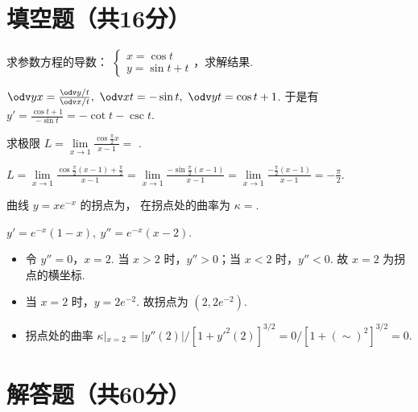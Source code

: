 \section{填空题（共16分）}

\begin{problem}[本题5分]
  求参数方程的导数：
  $
    \begin{cases}
      x = \cos t\\
      y = \sin t + t
    \end{cases}
  $，求解结果.
\end{problem}
\scratch[8ex]
\begin{solution}
  $ \odv yx = \frac{\odv y/t}{\odv x/t},~
    \odv xt = -\sin t,~ \odv yt = \cos t + 1$. 于是有
  $y' = \frac{\cos t + 1}{-\sin t} = -\cot t - \csc t$.
\end{solution}

\begin{problem}[本题5分]
  求极限 $L = \lim\limits_{x \to 1} \frac{\cos\frac\pi2 x}{x - 1} = $
  .
\end{problem}
\scratch[8ex]
\begin{solution}
  $ L = \lim\limits_{x \to 1} \frac{\cos\frac\pi2 (x - 1) + \frac\pi2}{x - 1}
      = \lim\limits_{x \to 1} \frac{-\sin\frac\pi2 (x - 1)}{x - 1}
      = \lim\limits_{x \to 1} \frac{-\frac\pi2 (x - 1)}{x - 1}
      = -\frac\pi2$.
\end{solution}

\begin{problem}[本题6分]
  曲线 $y = xe^{-x}$ 的拐点为，
  在拐点处的曲率为 $\kappa = $.  
\end{problem}
\scratch[12ex]
\begin{solution}
  $y' = e^{-x}(1 - x),~ y'' = e^{-x}(x - 2)$.
  \begin{itemize}
    \item 令 $y'' = 0$，$x = 2$.
      当 $x > 2$ 时，$y'' > 0$；当 $x < 2$ 时，$y'' < 0$. 故 $x = 2$ 为拐点的横坐标.
    \item 当 $x = 2$ 时，$y = 2e^{-2}$. 故拐点为 $(2,2e^{-2})$.
    \item 拐点处的曲率
    $\kappa|_{x = 2} = |y''(2)|/[1 + y'^2(2)]^{3/2}
                     = 0/[1 + (\sim)^2]^{3/2} = 0$.
  \end{itemize}
\end{solution}

\section{解答题（共60分）}

